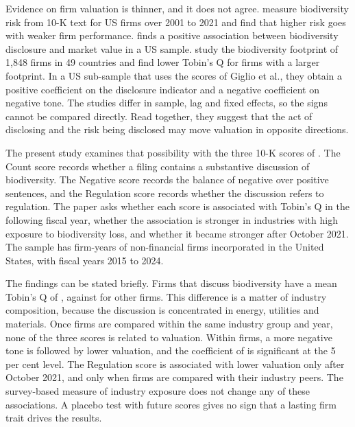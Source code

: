 \documentclass[12pt,a4paper]{article}
\begin{document}
Evidence on firm valuation is thinner, and it does not agree. \citet{bach2025} measure biodiversity risk from 10-K text for US firms over 2001 to 2021 and find that higher risk goes with weaker firm performance. \citet{he2024} finds a positive association between biodiversity disclosure and market value in a US sample. \citet{cosma2025} study the biodiversity footprint of 1,848 firms in 49 countries and find lower Tobin's Q for firms with a larger footprint. In a US sub-sample that uses the scores of Giglio et al., they obtain a positive coefficient on the disclosure indicator and a negative coefficient on negative tone. The studies differ in sample, lag and fixed effects, so the signs cannot be compared directly. Read together, they suggest that the act of disclosing and the risk being disclosed may move valuation in opposite directions.

The present study examines that possibility with the three 10-K scores of \citet{giglio2026}. The Count score records whether a filing contains a substantive discussion of biodiversity. The Negative score records the balance of negative over positive sentences, and the Regulation score records whether the discussion refers to regulation. The paper asks whether each score is associated with Tobin's Q in the following fiscal year, whether the association is stronger in industries with high exposure to biodiversity loss, and whether it became stronger after October 2021. The sample has \nFinal{} firm-years of non-financial firms incorporated in the United States, with fiscal years 2015 to 2024.

The findings can be stated briefly. Firms that discuss biodiversity have a mean Tobin's Q of \meanQOne{}, against \meanQZero{} for other firms. This difference is a matter of industry composition, because the discussion is concentrated in energy, utilities and materials. Once firms are compared within the same industry group and year, none of the three scores is related to valuation. Within firms, a more negative tone is followed by lower valuation, and the coefficient of \coefFAllNeg{} is significant at the 5 per cent level. The Regulation score is associated with lower valuation only after October 2021, and only when firms are compared with their industry peers. The survey-based measure of industry exposure does not change any of these associations. A placebo test with future scores gives no sign that a lasting firm trait drives the results.
\end{document}
